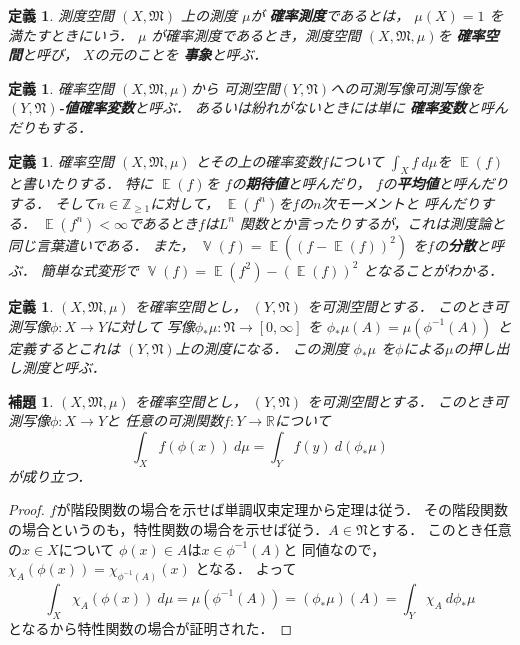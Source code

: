\documentclass[leqno, a4paper, 12pt]{jsarticle}
\newtheorem{lem}[thm]{補題}
\newtheorem{df}[thm]{定義}
\newcommand{\zz}{\mathbb{Z}}
\newcommand{\rr}{\mathbb{R}}
\DeclareMathOperator{\mean}{\mathbb{E}}
\DeclareMathOperator{\varian}{\mathbb{V}}
\begin{document}
\begin{df}
測度空間
$(X, \mathfrak{M})$
上の測度
$\mu$が
\textbf{確率測度}であるとは，
$\mu(X)=1$
を満たすときにいう．
$\mu$
が確率測度であるとき，測度空間
$(X, \mathfrak{M}, \mu)$を
\textbf{確率空間}と呼び，
$X$の元のことを
\textbf{事象}と呼ぶ．
\end{df}

\begin{df}
確率空間
$(X, \mathfrak{M}, \mu)$から
可測空間$(Y, \mathfrak{N})$への可測写像可測写像を
\textbf{$(Y, \mathfrak{N})$-値確率変数}と呼ぶ．
あるいは紛れがないときには単に
\textbf{確率変数}と呼んだりもする．
\end{df}

\begin{df}
確率空間
$(X, \mathfrak{M}, \mu)$
とその上の確率変数$f$について
$\int_{X}f\ d\mu$を
$\mean(f)$と書いたりする．
特に
$\mean(f)$を
$f$の\textbf{期待値}と呼んだり，
$f$の\textbf{平均値}と呼んだりする．
そして$n\in \zz_{\ge 1}$に対して，
$\mean(f^{n})$を$f$の$n$次モーメントと
呼んだりする．
$\mean(f^{n})<\infty$であるとき$f$は$L^{n}$
関数とか言ったりするが，これは測度論と同じ言葉遣いである．
また，
$\varian(f)=\mean((f-\mean(f))^{2})$
を$f$の\textbf{分散}と呼ぶ．
簡単な式変形で
$\varian(f)=\mean(f^{2})-(\mean(f))^{2}$
となることがわかる．
\end{df}


\begin{df}
$(X, \mathfrak{M}, \mu)$
を確率空間とし，
$(Y, \mathfrak{N})$
を可測空間とする．
このとき可測写像$\phi:X\to Y$に対して
写像$\phi_{*}\mu: \mathfrak{N}\to [0, \infty]$
を
$\phi_{*}\mu(A)=\mu(\phi^{-1}(A))$
と定義するとこれは
$(Y, \mathfrak{N})$上の測度になる．
この測度
$\phi_{*}\mu$
を$\phi$による$\mu$の押し出し測度と呼ぶ．
\end{df}
\begin{lem}\label{lem:push}
$(X, \mathfrak{M}, \mu)$
を確率空間とし，
$(Y, \mathfrak{N})$
を可測空間とする．
このとき可測写像$\phi:X\to Y$と
任意の可測関数$f: Y\to \rr$について
\[
\int_{X}f(\phi(x))\ d\mu
=\int_{Y} f(y)\ d(\phi_{*}\mu)
\]
が成り立つ．
\end{lem}
\begin{proof}
$f$が階段関数の場合を示せば単調収束定理から定理は従う．
その階段関数の場合というのも，特性関数の場合を示せば従う．$A\in \mathfrak{N}$とする．
このとき任意の$x\in X$について
$\phi(x)\in A$は$x\in \phi^{-1}(A)$と
同値なので，
$\chi_{A}(\phi(x))=\chi_{\phi^{-1}(A)}(x)$
となる．
よって
\[
\int_{X}\chi_{A}(\phi(x))\ d\mu
=\mu(\phi^{-1}(A))=(\phi_{*}\mu)(A)
=\int_{Y}\chi_{A}\ d\phi_{*}\mu
\]
となるから特性関数の場合が証明された．
\end{proof}
\end{document}

